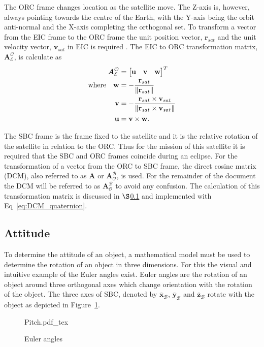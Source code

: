 The ORC frame changes location as the satellite move. The Z-axis is, however, always pointing towards the centre of the Earth, with the Y-axis being the orbit anti-normal and the X-axis completing the orthogonal set. To transform a vector from the EIC frame to the ORC frame the unit position vector, $\mathbf{r}_{sat}$ and the unit velocity vector, $\mathbf{v}_{sat}$ in EIC is required \cite{Chen_ground-target}. The EIC to ORC transformation matrix, $\boldsymbol{A}^{\mathcal{O}}_{\mathcal{E}}$, is calculate as
\begin{equation}
\label{Eq: ORC to EIC}
\begin{aligned}
	\boldsymbol{A}^{\mathcal{O}}_{\mathcal{E}} &= 
	\begin{bmatrix}
		\mathbf{u} & \mathbf{v} & \mathbf{w}\\
	\end{bmatrix}^T \\
\text{where} \quad
\mathbf{w} &= -\frac{\mathbf{r}_{sat}}{\left\lVert\mathbf{r}_{sat}\right\rVert} \\
\mathbf{v} &= -\frac{\mathbf{r}_{sat} \times \mathbf{v}_{sat}}{\left\lVert\mathbf{r}_{sat} \times \mathbf{v}_{sat}\right\rVert} \\
\mathbf{u} &= \mathbf{v} \times \mathbf{w}. \\
\end{aligned}
\end{equation}

The SBC frame is the frame fixed to the satellite and it is the relative rotation of the satellite in relation to the ORC. Thus for the mission of this satellite it is required that the SBC and ORC frames coincide during an eclipse. For the transformation of a vector from the ORC to SBC frame, the direct cosine matrix (DCM), also referred to as $\boldsymbol{A}$ or $\boldsymbol{A}^{\mathcal{B}}_{\mathcal{O}}$, is used. For the remainder of the document the DCM will be referred to as $\boldsymbol{A}^{\mathcal{B}}_{\mathcal{O}}$ to avoid any confusion. The calculation of this transformation matrix is discussed in $\S$\ref{subsection_quaternions} and implemented with Eq~\ref{eq:DCM_quaternion}.


\subsection{Attitude}
\label{subsection_quaternions}
To determine the attitude of an object, a mathematical model must be used to determine the rotation of an object in three dimensions. For this the visual and intuitive example of the Euler angles exist. Euler angles are the rotation of an object around three orthogonal axes which change orientation with the rotation of the object. The three axes of SBC, denoted by $\bar{\mathbf{x}}_{\mathcal{B}}$, $\bar{\mathbf{y}}_{\mathcal{B}}$ and $\bar{\mathbf{z}}_{\mathcal{B}}$ rotate with the object as depicted in Figure~\ref{fig:Pitch}.
\begin{figure}[!htb]
	\centering
	\def\svgwidth{10cm}
	{Pitch.pdf_tex}
	\caption{Euler angles}
	\label{fig:Pitch}
\end{figure}

